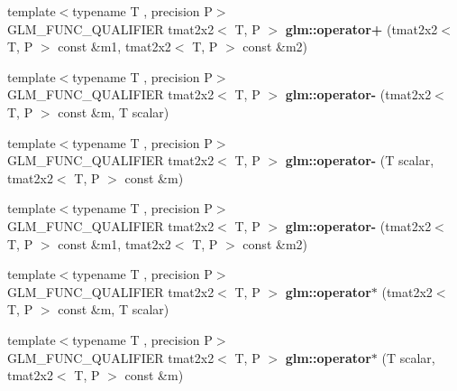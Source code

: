 \begin{DoxyCompactItemize}
{\footnotesize template$<$typename T , precision P$>$ }\\G\+L\+M\+\_\+\+F\+U\+N\+C\+\_\+\+Q\+U\+A\+L\+I\+F\+I\+ER tmat2x2$<$ T, P $>$ {\bfseries glm\+::operator+} (tmat2x2$<$ T, P $>$ const \&m1, tmat2x2$<$ T, P $>$ const \&m2)
\item 
\mbox{\label{type__mat2x2_8inl_a50c24306967a19f7524b27490ce23bc3}} 
{\footnotesize template$<$typename T , precision P$>$ }\\G\+L\+M\+\_\+\+F\+U\+N\+C\+\_\+\+Q\+U\+A\+L\+I\+F\+I\+ER tmat2x2$<$ T, P $>$ {\bfseries glm\+::operator-\/} (tmat2x2$<$ T, P $>$ const \&m, T scalar)
\item 
\mbox{\label{type__mat2x2_8inl_adf1f369903353d61cd0be840cdabb22a}} 
{\footnotesize template$<$typename T , precision P$>$ }\\G\+L\+M\+\_\+\+F\+U\+N\+C\+\_\+\+Q\+U\+A\+L\+I\+F\+I\+ER tmat2x2$<$ T, P $>$ {\bfseries glm\+::operator-\/} (T scalar, tmat2x2$<$ T, P $>$ const \&m)
\item 
\mbox{\label{type__mat2x2_8inl_a0d4974acd47ff586c5643bdf07de8a6d}} 
{\footnotesize template$<$typename T , precision P$>$ }\\G\+L\+M\+\_\+\+F\+U\+N\+C\+\_\+\+Q\+U\+A\+L\+I\+F\+I\+ER tmat2x2$<$ T, P $>$ {\bfseries glm\+::operator-\/} (tmat2x2$<$ T, P $>$ const \&m1, tmat2x2$<$ T, P $>$ const \&m2)
\item 
\mbox{\label{type__mat2x2_8inl_a123e9fab5a2c065c81e3f62938322be7}} 
{\footnotesize template$<$typename T , precision P$>$ }\\G\+L\+M\+\_\+\+F\+U\+N\+C\+\_\+\+Q\+U\+A\+L\+I\+F\+I\+ER tmat2x2$<$ T, P $>$ {\bfseries glm\+::operator$\ast$} (tmat2x2$<$ T, P $>$ const \&m, T scalar)
\item 
\mbox{\label{type__mat2x2_8inl_aa0bcbd5368523c00bd1952486a5ae5fa}} 
{\footnotesize template$<$typename T , precision P$>$ }\\G\+L\+M\+\_\+\+F\+U\+N\+C\+\_\+\+Q\+U\+A\+L\+I\+F\+I\+ER tmat2x2$<$ T, P $>$ {\bfseries glm\+::operator$\ast$} (T scalar, tmat2x2$<$ T, P $>$ const \&m)
\item 
\mbox{\label{type__mat2x2_8inl_a65dc9a4505d414c9c07286a793588031}} 

\end{DoxyCompactItemize}
